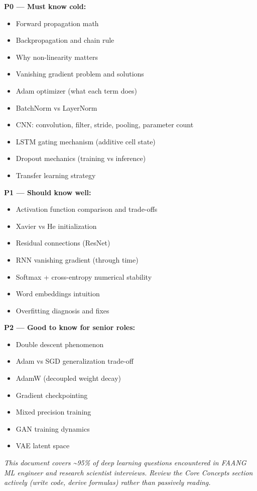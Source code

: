\documentclass[11pt]{article}
\providecommand{\tightlist}{\setlength{\itemsep}{1pt}\setlength{\parskip}{0pt}}
\begin{document}
\textbf{P0 --- Must know cold:}

\begin{itemize}
\tightlist
\item
  Forward propagation math
\item
  Backpropagation and chain rule
\item
  Why non-linearity matters
\item
  Vanishing gradient problem and solutions
\item
  Adam optimizer (what each term does)
\item
  BatchNorm vs LayerNorm
\item
  CNN: convolution, filter, stride, pooling, parameter count
\item
  LSTM gating mechanism (additive cell state)
\item
  Dropout mechanics (training vs inference)
\item
  Transfer learning strategy
\end{itemize}

\textbf{P1 --- Should know well:}

\begin{itemize}
\tightlist
\item
  Activation function comparison and trade-offs
\item
  Xavier vs He initialization
\item
  Residual connections (ResNet)
\item
  RNN vanishing gradient (through time)
\item
  Softmax + cross-entropy numerical stability
\item
  Word embeddings intuition
\item
  Overfitting diagnosis and fixes
\end{itemize}

\textbf{P2 --- Good to know for senior roles:}

\begin{itemize}
\tightlist
\item
  Double descent phenomenon
\item
  Adam vs SGD generalization trade-off
\item
  AdamW (decoupled weight decay)
\item
  Gradient checkpointing
\item
  Mixed precision training
\item
  GAN training dynamics
\item
  VAE latent space
\end{itemize}

\emph{This document covers \textasciitilde95\% of deep learning questions encountered in FAANG ML engineer and research scientist interviews. Review the Core Concepts section actively (write code, derive formulas) rather than passively reading.}
\end{document}
